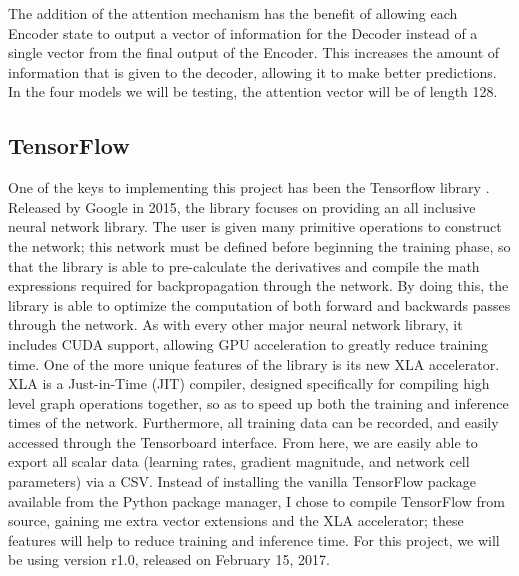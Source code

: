 \documentclass[pageno]{jpaper}
\begin{document}
The addition of the attention mechanism has the benefit of allowing each Encoder state to output a vector of information for the Decoder instead of a single vector from the final output of the Encoder.  This increases the amount of information that is given to the decoder, allowing it to make better predictions.  In the four models we will be testing, the attention vector will be of length 128.

\subsection{TensorFlow}
One of the keys to implementing this project has been the Tensorflow library \cite{tensorflow:2015}.  Released by Google in 2015, the library focuses on providing an all inclusive neural network library.  The user is given many primitive operations to construct the network; this network must be defined before beginning the training phase, so that the library is able to pre-calculate the derivatives and compile the math expressions required for backpropagation through the network.  By doing this, the library is able to optimize the computation of both forward and backwards passes through the network.  As with every other major neural network library, it includes CUDA support, allowing GPU acceleration to greatly reduce training time.  One of the more unique features of the library is its new XLA accelerator.  XLA is a Just-in-Time (JIT) compiler, designed specifically for compiling high level graph operations together, so as to speed up both the training and inference times of the network.  Furthermore, all training data can be recorded, and easily accessed through the Tensorboard interface.  From here, we are easily able to export all scalar data (learning rates, gradient magnitude, and network cell parameters) via a CSV.  Instead of installing the vanilla TensorFlow package available from the Python package manager, I chose to compile TensorFlow from source, gaining me extra vector extensions and the XLA accelerator; these features will help to reduce training and inference time.  For this project, we will be using version r1.0, released on February 15, 2017.
\end{document}
